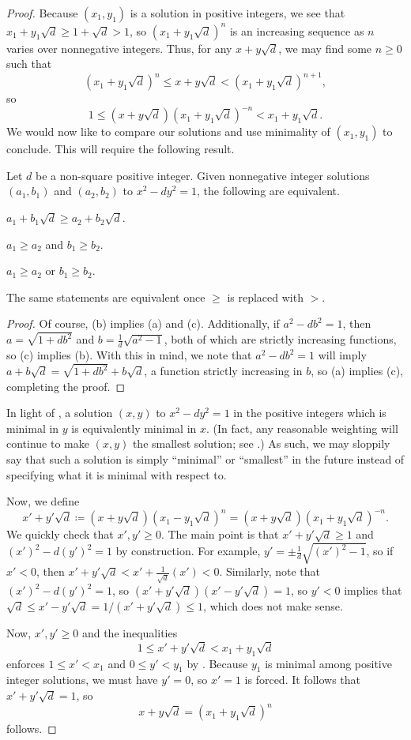 \documentclass[../notes.tex]{subfiles}
\begin{document}
\begin{proof}
	Because $(x_1,y_1)$ is a solution in positive integers, we see that $x_1+y_1\sqrt d\ge1+\sqrt d>1$, so $\left(x_1+y_1\sqrt d\right)^n$ is an increasing sequence as $n$ varies over nonnegative integers. Thus, for any $x+y\sqrt d$, we may find some $n\ge0$ such that
	\[\left(x_1+y_1\sqrt d\right)^n\le x+y\sqrt d<\left(x_1+y_1\sqrt d\right)^{n+1},\]
	so
	\[1\le\left(x+y\sqrt d\right)\left(x_1+y_1\sqrt d\right)^{-n}<x_1+y_1\sqrt d.\]
	We would now like to compare our solutions and use minimality of $(x_1,y_1)$ to conclude. This will require the following result.
	\begin{lemma} \label{lem:compare-units}
		Let $d$ be a non-square positive integer. Given nonnegative integer solutions $(a_1,b_1)$ and $(a_2,b_2)$ to $x^2-dy^2=1$, the following are equivalent.
		\begin{listalph}
			\item $a_1+b_1\sqrt d\ge a_2+b_2\sqrt d$.
			\item $a_1\ge a_2$ and $b_1\ge b_2$.
			\item $a_1\ge a_2$ or $b_1\ge b_2$.
		\end{listalph}
		The same statements are equivalent once $\ge$ is replaced with $>$.
	\end{lemma}
	\begin{proof}
		Of course, (b) implies (a) and (c). Additionally, if $a^2-db^2=1$, then $a=\sqrt{1+db^2}$ and $b=\frac1d\sqrt{a^2-1}$, both of which are strictly increasing functions, so (c) implies (b). With this in mind, we note that $a^2-db^2=1$ will imply $a+b\sqrt d=\sqrt{1+db^2}+b\sqrt d$, a function strictly increasing in $b$, so (a) implies (c), completing the proof.
	\end{proof}
	\begin{remark}
		In light of , a solution $(x,y)$ to $x^2-dy^2=1$ in the positive integers which is minimal in $y$ is equivalently minimal in $x$. (In fact, any reasonable weighting will continue to make $(x,y)$ the smallest solution; see .) As such, we may sloppily say that such a solution is simply ``minimal'' or ``smallest'' in the future instead of specifying what it is minimal with respect to.
	\end{remark}
	Now, we define
	\[x'+y'\sqrt d\coloneqq\left(x+y\sqrt d\right)\left(x_1-y_1\sqrt d\right)^n=\left(x+y\sqrt d\right)\left(x_1+y_1\sqrt d\right)^{-n}.\]
	We quickly check that $x',y'\ge0$. The main point is that $x'+y'\sqrt d\ge1$ and $(x')^2-d(y')^2=1$ by construction. For example, $y'=\pm\frac1d\sqrt{(x')^2-1}$, so if $x'<0$, then $x'+y'\sqrt d<x'+\frac1{\sqrt d}(x')<0$. Similarly, note that $(x')^2-d(y')^2=1$, so $\left(x'+y'\sqrt d\right)\left(x'-y'\sqrt d\right)=1$, so $y'<0$ implies that $\sqrt d\le x'-y'\sqrt d=1/\left(x'+y'\sqrt d\right)\le1$, which does not make sense.

	Now, $x',y'\ge0$ and the inequalities
	\[1\le x'+y'\sqrt d<x_1+y_1\sqrt d\]
	enforces $1\le x'<x_1$ and $0\le y'<y_1$ by . Because $y_1$ is minimal among positive integer solutions, we must have $y'=0$, so $x'=1$ is forced. It follows that $x'+y'\sqrt d=1$, so
	\[x+y\sqrt d=\left(x_1+y_1\sqrt d\right)^n\]
	follows.
\end{proof}
\end{document}
